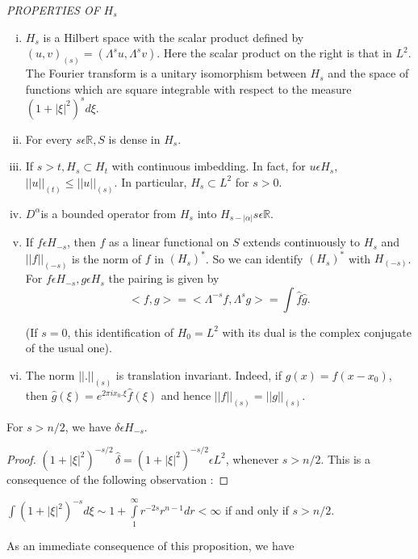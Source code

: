 \noindent 
\textit{PROPERTIES OF} $H_s$
\begin{enumerate}[(i)]
\item $H_s$ is a Hilbert space with the scalar product defined by
  $(u, v)_{(s)} = (\Lambda^s u, \Lambda^s v)$. Here the scalar product
  on the right is that in $L^2$. The Fourier transform is a unitary
  isomorphism between $H_s$ and the space of functions which are
  square integrable with respect to the measure $(1 + | \xi |^2)^s d
  \xi$. 
\item For every $s \epsilon \mathbb{R}, S$ is dense in $H_s$.

\item If $s > t, H_s \subset H_t$ with continuous imbedding. In fact,
  for $u \epsilon H_s$,\break $|| u||_{(t)} \le || u ||_{(s)}$. In
  particular, $H_s \subset L^2$ for $s > 0$. 
\item $D^\alpha$\pageoriginale is a bounded operator from $H_s$ into $H_{s - |
  \alpha |} s \epsilon \mathbb{R}$. 
\item If $f \epsilon H_{-s}$, then $f$ as a linear functional on
  $S$ extends continuously to $H_s$ and $|| f ||_{(-s)}$ is the norm
  of $f$ in $(H_s)^*$. So we can identify $(H_s)^*$ with
  $H_{(-s)}$. For $f \epsilon H_{-s}, g \epsilon H_s$ the
  pairing is given by  
  $$
  < f, g > = < \Lambda^{-s} f, \Lambda^s g > = \int \hat{f} \hat{g}.
  $$
  
  (If $s = 0$, this identification of $H_0 = L^2$ with its dual is the
  complex conjugate of the usual one). 
\item The norm $||. ||_{(s)}$ is translation invariant. Indeed, if
  $g(x) = f (x - x_0)$, then $\hat{g} (\xi) = e^{2 \pi ix_0. \xi}
  \hat{f} (\xi)$ and hence $|| f ||_{(s)} = || g ||_{(s)}$. 
\end{enumerate}

\setcounter{prop}{3}
\begin{prop}\label{chap3:sec1:prop3.4} %
For $s > n/2$, we have $\delta \epsilon H_{-s}$.
\end{prop}

\begin{proof}
$(1 + | \xi |^2)^{-s/2} \,\hat{\delta} = (1 + | \xi |^2)^{-s/2}
  \epsilon L^2$, whenever $s > n/2$. This is a consequence of the
  following observation : 
\end{proof}

$\int (1 + | \xi |^2)^{-s} d \xi \sim 1+ \int\limits_1^\infty r^{-2s}
r^{n-1} dr < \infty$ if and only if $s > n/2$. 

As an immediate consequence of this proposition, we have 

